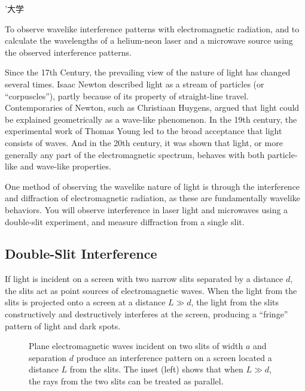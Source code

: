 ’大学\documentclass[addpoints]{physlabs}
\begin{document}
\begin{labsection}

\begin{objective}
    To observe wavelike interference patterns with electromagnetic radiation, and to calculate the wavelengths of a helium-neon laser and a microwave source using the observed interference patterns.
\end{objective}

\begin{theory}
    Since the 17th Century, the prevailing view of the nature of light has changed several times. Isaac Newton described light as a stream of particles (or ``corpuscles''), partly because of its property of straight-line travel. Contemporaries of Newton, such as Christiaan Huygens, argued that light could be explained geometrically as a wave-like phenomenon. In the 19th century, the experimental work of Thomas Young led to the broad acceptance that light consists of waves. And in the 20th century, it was shown that light, or more generally any part of the electromagnetic spectrum, behaves with both particle-like and wave-like properties.
    
    One method of observing the wavelike nature of light is through the interference and diffraction of electromagnetic radiation, as these are fundamentally wavelike behaviors. You will observe interference in laser light and microwaves using a double-slit experiment, and measure diffraction from a single slit.

    \subsection*{Double-Slit Interference}

    If light is incident on a screen with two narrow slits separated by a distance $d$, the slits act as point sources of electromagnetic waves. When the light from the slits is projected onto a screen at a distance $L\gg d$, the light from the slits constructively and destructively interferes at the screen, producing a ``fringe'' pattern of light and dark spots.

    \begin{figure}[ht]
        \centering
        
        \caption{Plane electromagnetic waves incident on two slits of width $a$ and separation $d$ produce an interference pattern on a screen located a distance $L$ from the slits. The inset (left) shows that when $L\gg d$, the rays from the two slits can be treated as parallel.}
        \label{fig: two slit interference}
    \end{figure}


\end{theory}
\end{labsection}
\end{document}
